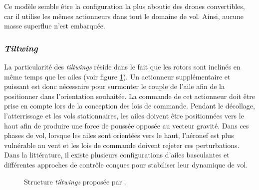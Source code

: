         Ce modèle semble être la configuration la plus aboutie des drones convertibles, car il utilise les mêmes actionneurs dans tout le domaine de vol. Ainsi, aucune masse superflue n'est embarquée.

    
        \subsubsection*{\textit{Tiltwing}} 
        La particularité des \textit{tiltwings} réside dans le fait que les rotors sont inclinés en même temps que les ailes (voir figure \ref{fig:tiltwing}). Un actionneur supplémentaire et puissant est donc nécessaire pour surmonter le couple de l'aile afin de la positionner dans l'orientation souhaitée. La commande de cet actionneur doit être prise en compte lors de la conception des lois de commande. Pendant le décollage, l'atterrissage et les vols stationnaires, les ailes doivent être positionnées vers le haut afin de produire une force de poussée opposée au vecteur gravité. Dans ces phases de vol, lorsque les ailes sont orientées vers le haut, l'aéronef est plus vulnérable au vent et les lois de commande doivent rejeter ces perturbations. Dans la littérature, il existe plusieurs configurations d'ailes basculantes et différentes approches de contrôle conçues pour stabiliser leur dynamique de vol.
        \begin{figure}[ht!]
            \centering
            \caption{Structure \textit{tiltwings}  proposée par \cite{Aero2_2024, Ostermann2012ControlCO}.}
            \label{fig:tiltwing}
        \end{figure}

